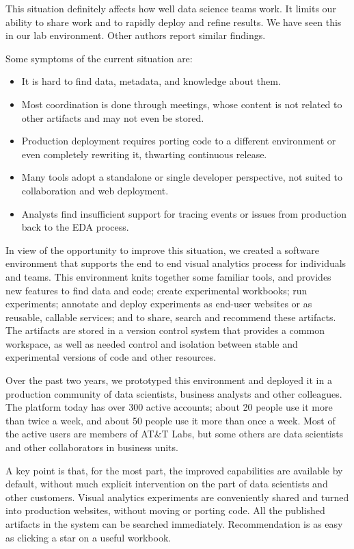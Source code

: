 This situation definitely affects how well data science teams work.
It limits our ability to share work and to rapidly deploy and refine results.
We have seen this in our lab environment.
Other authors report similar findings.

Some symptoms of the current situation are:
\begin{itemize}
\item It is hard to find data, metadata, and knowledge about them.
\item Most coordination is done through meetings, whose content is not related to other artifacts and may not even be stored.
\item Production deployment requires porting code to a different environment or even completely rewriting it, thwarting continuous release.
\item Many tools adopt a standalone or single developer perspective,
not suited to collaboration and web deployment. 
\item Analysts find insufficient support for tracing events or issues from production back to the EDA process.
\end{itemize}

In view of the opportunity to improve this situation,
we created a software environment that supports the end to end
visual analytics process for individuals and teams.
This environment knits together some familiar tools, and 
provides new features to find data and code; create experimental workbooks;
run experiments; annotate and deploy experiments as end-user websites or
as reusable, callable services; and to share, search and recommend these artifacts. The artifacts are stored in a version
control system that provides a common workspace, as well as needed control
and isolation between stable and experimental versions of code and other
resources. 

Over the past two years, we prototyped this environment and deployed it in a
production community of data scientists, business analysts and other colleagues.
The platform today has over 300 active accounts; about 20 people use it more
than twice a week, and about 50 people use it more than once a week.  Most of
the active users are members of AT\&T Labs, but some others are data scientists
and other collaborators in business units. 

A key point is that, for the most part, the improved capabilities are
available by default, without much explicit intervention on the part of
data scientists and other customers. Visual analytics experiments are
conveniently shared and turned into production websites, without moving
or porting code. All the published artifacts in the system can be
searched immediately. Recommendation is as easy as clicking a star
on a useful workbook.

